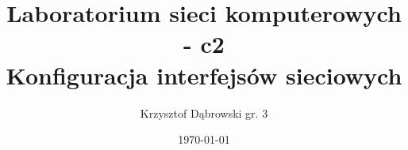 \documentclass{article}
\title{Laboratorium sieci komputerowych - c2 \\ Konfiguracja interfejsów sieciowych}
\author{Krzysztof Dąbrowski gr. 3}
\date{\today}
\begin{document}
\maketitle{}
\tableofcontents{}
\newpage
\end{document}
